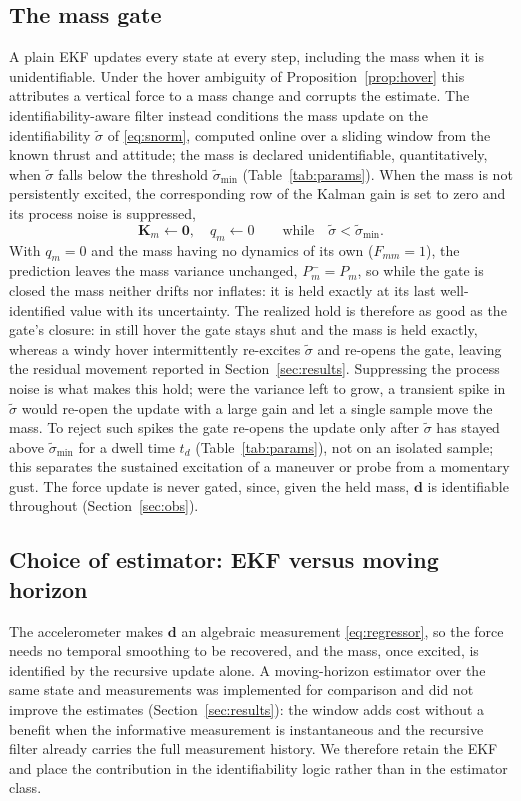 \documentclass{ieeeaccess}
\newcommand{\vect}[1]{\bm{#1}}
\newcommand{\mat}[1]{\mathbf{#1}}
\begin{document}
\subsection{The mass gate}\label{sec:gate}
A plain EKF updates every state at every step, including the mass when it is
unidentifiable. Under the hover ambiguity of Proposition~\ref{prop:hover} this
attributes a vertical force to a mass change and corrupts the estimate. The
identifiability-aware filter instead conditions the mass update on the
identifiability $\tilde\sigma$ of \eqref{eq:snorm}, computed online over a sliding
window from the known thrust and attitude; the mass is declared unidentifiable,
quantitatively, when $\tilde\sigma$ falls below the threshold $\tilde\sigma_{\min}$
(Table~\ref{tab:params}). When the mass is not persistently
excited, the corresponding row of the Kalman gain is set to zero and its process
noise is suppressed,
\begin{equation}
\mat{K}_m\leftarrow\vect{0},\quad q_m\leftarrow 0
\qquad\text{while}\quad \tilde\sigma<\tilde\sigma_{\min}.
\label{eq:gate}
\end{equation}
With $q_m=0$ and the mass having no dynamics of its own ($F_{mm}=1$), the
prediction leaves the mass variance unchanged, $P_m^-=P_m$, so while the gate is
closed the mass neither drifts nor inflates: it is held exactly at its last
well-identified value with its uncertainty. The realized hold is therefore as good
as the gate's closure: in still hover the gate stays shut and the mass is held
exactly, whereas a windy hover intermittently re-excites $\tilde\sigma$ and
re-opens the gate, leaving the residual movement reported in
Section~\ref{sec:results}. Suppressing the process noise is what
makes this hold; were the variance left to grow, a transient spike in
$\tilde\sigma$ would re-open the update with a large gain and let a single sample
move the mass. To reject such spikes the gate re-opens the update only after
$\tilde\sigma$ has stayed above $\tilde\sigma_{\min}$ for a dwell time $t_d$
(Table~\ref{tab:params}), not on an isolated sample; this separates the sustained
excitation of a maneuver or probe from a momentary gust. The force update is
never gated, since, given the held mass, $\vect{d}$ is identifiable throughout
(Section~\ref{sec:obs}).

\subsection{Choice of estimator: EKF versus moving horizon}\label{sec:nomhe}
The accelerometer makes $\vect{d}$ an algebraic measurement \eqref{eq:regressor},
so the force needs no temporal smoothing to be recovered, and the mass, once
excited, is identified by the recursive update alone. A moving-horizon estimator
over the same state and measurements was implemented for comparison and did not
improve the estimates (Section~\ref{sec:results}): the window adds cost without a
benefit when the informative measurement is instantaneous and the recursive
filter already carries the full measurement history. We therefore retain the EKF
and place the contribution in the identifiability logic rather than in the
estimator class.
\end{document}

